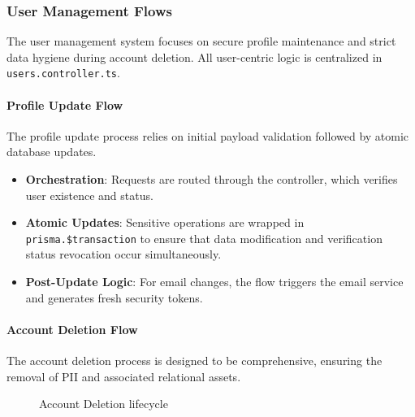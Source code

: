 \subsubsection{User Management Flows}

The user management system focuses on secure profile maintenance and strict data hygiene during account deletion. All user-centric logic is centralized in \texttt{users.controller.ts}.

\paragraph{Profile Update Flow}
The profile update process relies on initial payload validation followed by atomic database updates.

\begin{itemize}
    \item \textbf{Orchestration}: Requests are routed through the controller, which verifies user existence and status.
    \item \textbf{Atomic Updates}: Sensitive operations are wrapped in \texttt{prisma.\$transaction} to ensure that data modification and verification status revocation occur simultaneously.
    \item \textbf{Post-Update Logic}: For email changes, the flow triggers the email service and generates fresh security tokens.
\end{itemize}

\paragraph{Account Deletion Flow}
The account deletion process is designed to be comprehensive, ensuring the removal of PII and associated relational assets.

\begin{figure}[H]
\centering
{}
\caption{Account Deletion lifecycle}
\label{fig:deletion-flow}
\end{figure}

